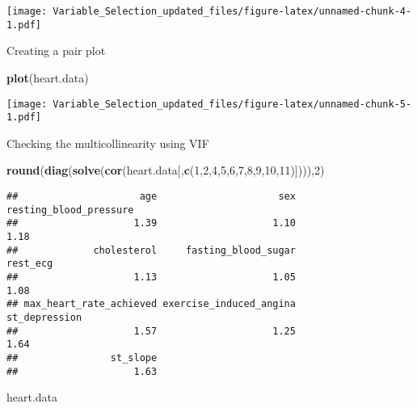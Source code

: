\documentclass[]{article}
\newenvironment{Shaded}{\begin{snugshade}}{\end{snugshade}}
\newcommand{\DecValTok}[1]{\textcolor[rgb]{0.00,0.00,0.81}{#1}}
\newcommand{\KeywordTok}[1]{\textcolor[rgb]{0.13,0.29,0.53}{\textbf{#1}}}
\newcommand{\NormalTok}[1]{#1}
\begin{document}
\texttt{[image: Variable\_Selection\_updated\_files/figure-latex/unnamed-chunk-4-1.pdf]}

Creating a pair plot

\begin{Shaded}
\begin{Highlighting}[]
\KeywordTok{plot}\NormalTok{(heart.data)}
\end{Highlighting}
\end{Shaded}

\texttt{[image: Variable\_Selection\_updated\_files/figure-latex/unnamed-chunk-5-1.pdf]}

Checking the multicollinearity using VIF

\begin{Shaded}
\begin{Highlighting}[]
\KeywordTok{round}\NormalTok{(}\KeywordTok{diag}\NormalTok{(}\KeywordTok{solve}\NormalTok{(}\KeywordTok{cor}\NormalTok{(heart.data[,}\KeywordTok{c}\NormalTok{(}\DecValTok{1}\NormalTok{,}\DecValTok{2}\NormalTok{,}\DecValTok{4}\NormalTok{,}\DecValTok{5}\NormalTok{,}\DecValTok{6}\NormalTok{,}\DecValTok{7}\NormalTok{,}\DecValTok{8}\NormalTok{,}\DecValTok{9}\NormalTok{,}\DecValTok{10}\NormalTok{,}\DecValTok{11}\NormalTok{)]))),}\DecValTok{2}\NormalTok{)}
\end{Highlighting}
\end{Shaded}

\begin{verbatim}
##                     age                     sex  resting_blood_pressure 
##                    1.39                    1.10                    1.18 
##             cholesterol     fasting_blood_sugar                rest_ecg 
##                    1.13                    1.05                    1.08 
## max_heart_rate_achieved exercise_induced_angina           st_depression 
##                    1.57                    1.25                    1.64 
##                st_slope 
##                    1.63
\end{verbatim}

\begin{Shaded}
\begin{Highlighting}[]
\NormalTok{heart.data}
\end{Highlighting}
\end{Shaded}
\end{document}
